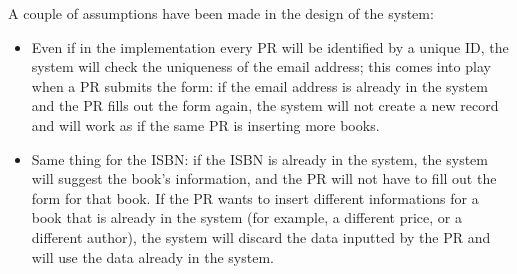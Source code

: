 A couple of assumptions have been made in the design of the system:

\begin{itemize}
    \item Even if in the implementation every PR will be identified by a unique ID, the system will check the uniqueness of the email address; this comes into play when a PR submits the form: if the email address is already in the system and the PR fills out the form again, the system will not create a new record and will work as if the same PR is inserting more books.
    \item Same thing for the ISBN: if the ISBN is already in the system, the system will suggest the book's information, and the PR will not have to fill out the form for that book. If the PR wants to insert different informations for a book that is already in the system (for example, a different price, or a different author), the system will discard the data inputted by the PR and will use the data already in the system.
\end{itemize}